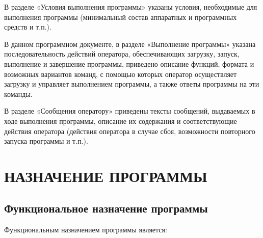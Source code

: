 \documentclass[14pt,a4paper,final]{extreport}
\begin{document}
В разделе «Условия выполнения программы» указаны условия, необходимые для выполнения программы (минимальный состав аппаратных и программных средств и т.п.).

В данном программном документе, в разделе «Выполнение программы» указана последовательность действий оператора, обеспечивающих загрузку, запуск, выполнение и завершение программы, приведено описание функций, формата и возможных вариантов команд, с помощью которых оператор осуществляет загрузку и управляет выполнением программы, а также ответы программы на эти команды.

В разделе «Сообщения оператору» приведены тексты сообщений, выдаваемых в ходе выполнения программы, описание их содержания и соответствующие действия оператора (действия оператора в случае сбоя, возможности повторного запуска программы и т.п.).

\pagebreak


\tableofcontents
\pagebreak

\chapter{ НАЗНАЧЕНИЕ ПРОГРАММЫ}
\section{ Функциональное назначение программы}
Функциональным назначением программы является: 
\end{document}
